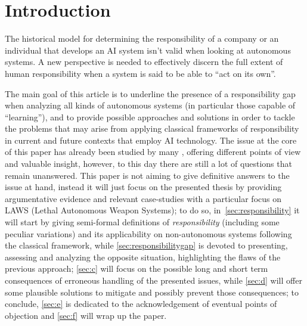 \section{Introduction}\label{sec:introduction}

The historical model for determining the responsibility of a company or an individual that develops an AI system isn't valid when looking at autonomous systems.
A new perspective is needed to effectively discern the full extent of human responsibility when a system is said to be able to ``act on its own''.

The main goal of this article is to underline the presence of a responsibility gap \parencite{MATTRG} when analyzing all kinds of autonomous systems (in particular those capable of ``learning''), and to provide possible approaches and solutions in order to tackle the problems that may arise from applying classical frameworks of responsibility in current and future contexts that employ AI technology.
The issue at the core of this paper has already been studied by many \parencite{MATTRG, SANFRG, COEAIR, NOVAIA}, offering different points of view and valuable insight, however, to this day there are still a lot of questions that remain unanswered.
This paper is not aiming to give definitive answers to the issue at hand, instead it will just focus on the presented thesis by providing argumentative evidence and relevant case-studies with a particular focus on LAWS (Lethal Autonomous Weapon Systems); to do so, in~\autoref{sec:responsibility} it will start by giving semi-formal definitions of \textit{responsibility} (including some peculiar variations) and its applicability on non-autonomous systems following the classical framework, while \autoref{sec:responsibilitygap} is devoted to presenting, assessing and analyzing the opposite situation, highlighting the flaws of the previous approach; \autoref{sec:c} will focus on the possible long and short term consequences of erroneous handling of the presented issues, while \autoref{sec:d} will offer some plausible solutions to mitigate and possibly prevent those consequences; to conclude, \autoref{sec:e} is dedicated to the acknowledgement of eventual points of objection and \autoref{sec:f} will wrap up the paper.